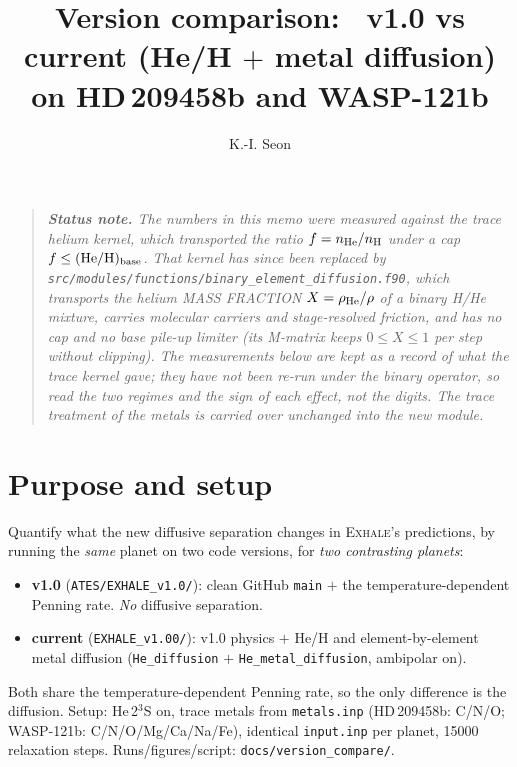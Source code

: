 \documentclass{my_memo}
\title{Version comparison: \EXHALE\ v1.0 vs current (He/H $+$ metal diffusion)\\
on HD\,209458b and WASP-121b}
\author{K.-I. Seon}
\date{\docmoddate}
\newcommand{\EXHALE}{\textsc{Exhale}}
\begin{document}
\maketitle

\begin{quote}\small\itshape
\textbf{Status note.} The numbers in this memo were measured against the
\emph{trace} helium kernel, which transported the ratio $f=n_{\rm He}/n_{\rm H}$
under a cap $f\le({\rm He/H})_{\rm base}$.  That kernel has since been replaced
by \texttt{src/modules/functions/binary\_element\_diffusion.f90}, which
transports the helium MASS FRACTION $X=\rho_{\rm He}/\rho$ of a binary H/He
mixture, carries molecular carriers and stage-resolved friction, and has no cap
and no base pile-up limiter (its M-matrix keeps $0\le X\le1$ per step without
clipping).  The measurements below are kept as a record of what the trace kernel
gave; they have not been re-run under the binary operator, so read the two
regimes and the sign of each effect, not the digits.  The trace treatment of
the metals is carried over unchanged into the new module.
\end{quote}

\section{Purpose and setup}

Quantify what the new diffusive separation changes in \EXHALE's predictions, by running the
\emph{same} planet on two code versions, for \emph{two contrasting planets}:

\begin{itemize}
  \item \textbf{v1.0} (\texttt{ATES/EXHALE\_v1.0/}): clean GitHub \texttt{main} $+$ the
    temperature-dependent Penning rate. \emph{No} diffusive separation.
  \item \textbf{current} (\texttt{EXHALE\_v1.00/}): v1.0 physics $+$ He/H and
    element-by-element metal diffusion
    (\texttt{He\_diffusion} $+$ \texttt{He\_\allowbreak metal\_\allowbreak diffusion},
    ambipolar on).
\end{itemize}

Both share the temperature-dependent Penning rate, so the only difference is the diffusion.
Setup: He\,2$^3$S on, trace metals from \texttt{metals.inp} (HD\,209458b: C/N/O; WASP-121b:
C/N/O/Mg/Ca/Na/Fe), identical \texttt{input.inp} per planet, 15000 relaxation steps.
Runs/figures/script: \texttt{docs/version\_compare/}.
\end{document}
